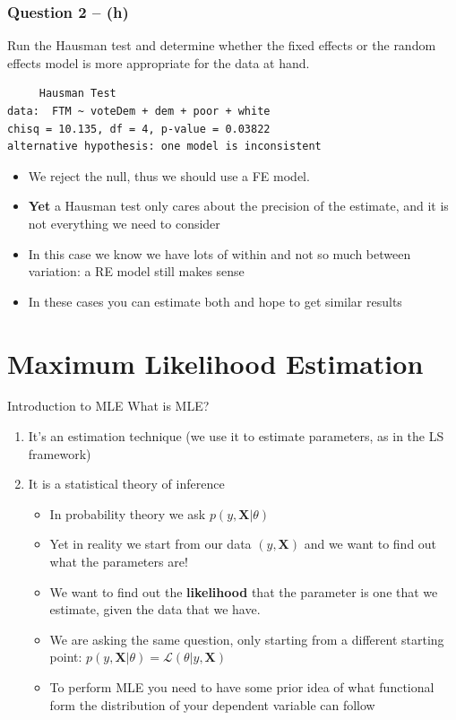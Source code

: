 \documentclass[xcolor=table,dvipsnames]{beamer}
\begin{document}
\begin{frame}[fragile]
\frametitle{Question 2 -- (h)}
Run the Hausman test and determine whether the fixed effects or the random effects model is more appropriate for the data at hand. \pause
\begin{verbatim}
     Hausman Test
data:  FTM ~ voteDem + dem + poor + white
chisq = 10.135, df = 4, p-value = 0.03822
alternative hypothesis: one model is inconsistent
\end{verbatim} \pause
\begin{itemize}
\item We reject the null, thus we should use a FE model. \pause 
\item \textbf{Yet} a Hausman test only cares about the precision of the estimate, and it is not everything we need to consider \pause
\item In this case we know we have lots of within and not so much between variation: a RE model still makes sense \pause
\item In these cases you can estimate both and hope to get similar results
\end{itemize}
\end{frame}

\section{Maximum Likelihood Estimation}

\begin{frame}{Introduction to MLE}
What is MLE? 
\begin{enumerate}
\item It's an estimation technique (we use it to estimate parameters, as in the LS framework) \pause
\item It is a statistical theory of inference \pause
\begin{itemize}
\item In probability theory we ask $p(y,\mathbf{X}|\theta)$ \pause
\item Yet in reality we start from our data $(y, \mathbf{X})$ and we want to find out what the parameters are! \pause
\item We want to find out the \textbf{likelihood} that the parameter is one that we estimate, given the data that we have. \pause
\item We are asking the same question, only starting from a different starting point: $p(y,\mathbf{X}|\theta)=\mathcal{L}(\theta|y,\mathbf{X})$ \pause
\item To perform MLE you need to have some prior idea of what functional form the distribution of your dependent variable can follow
\end{itemize}
\end{enumerate}
\end{frame}
\end{document}
